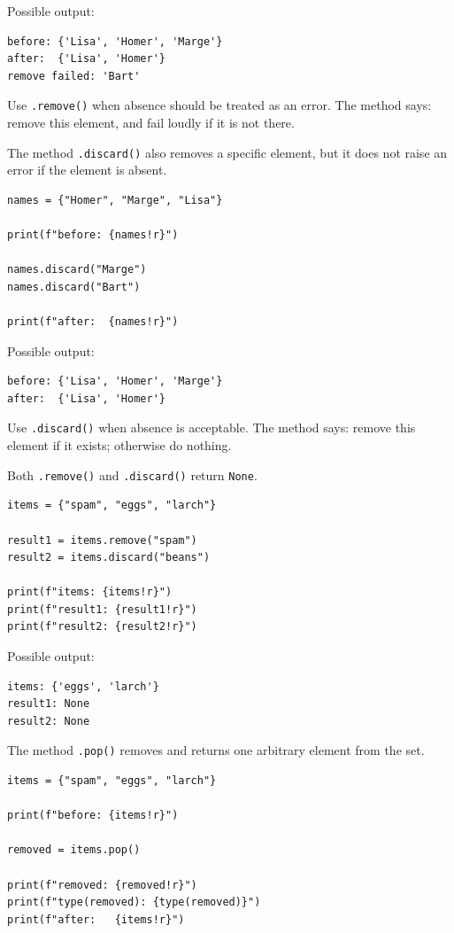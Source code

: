 Possible output:

\begin{verbatim}
before: {'Lisa', 'Homer', 'Marge'}
after:  {'Lisa', 'Homer'}
remove failed: 'Bart'
\end{verbatim}

Use \texttt{.remove()} when absence should be treated as an error. The method says: remove this element, and fail loudly if it is not there.

The method \texttt{.discard()} also removes a specific element, but it does not raise an error if the element is absent.

\begin{verbatim}
names = {"Homer", "Marge", "Lisa"}

print(f"before: {names!r}")

names.discard("Marge")
names.discard("Bart")

print(f"after:  {names!r}")
\end{verbatim}

Possible output:

\begin{verbatim}
before: {'Lisa', 'Homer', 'Marge'}
after:  {'Lisa', 'Homer'}
\end{verbatim}

Use \texttt{.discard()} when absence is acceptable. The method says: remove this element if it exists; otherwise do nothing.

Both \texttt{.remove()} and \texttt{.discard()} return \texttt{None}.

\begin{verbatim}
items = {"spam", "eggs", "larch"}

result1 = items.remove("spam")
result2 = items.discard("beans")

print(f"items: {items!r}")
print(f"result1: {result1!r}")
print(f"result2: {result2!r}")
\end{verbatim}

Possible output:

\begin{verbatim}
items: {'eggs', 'larch'}
result1: None
result2: None
\end{verbatim}

The method \texttt{.pop()} removes and returns one arbitrary element from the set.

\begin{verbatim}
items = {"spam", "eggs", "larch"}

print(f"before: {items!r}")

removed = items.pop()

print(f"removed: {removed!r}")
print(f"type(removed): {type(removed)}")
print(f"after:   {items!r}")
\end{verbatim}


